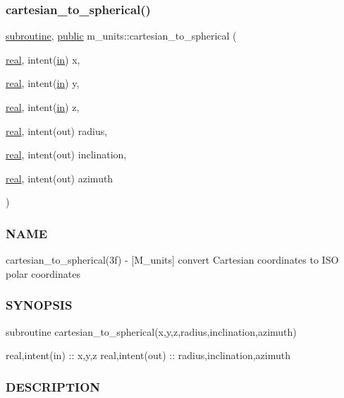 \subsubsection{\texorpdfstring{cartesian\+\_\+to\+\_\+spherical()}{cartesian\_to\_spherical()}}
{\footnotesize\ttfamily \hyperlink{M__stopwatch_83_8txt_acfbcff50169d691ff02d4a123ed70482}{subroutine}, \hyperlink{M__stopwatch_83_8txt_a2f74811300c361e53b430611a7d1769f}{public} m\+\_\+units\+::cartesian\+\_\+to\+\_\+spherical (\begin{DoxyParamCaption}\item[{\hyperlink{read__watch_83_8txt_abdb62bde002f38ef75f810d3a905a823}{real}, intent(\hyperlink{M__journal_83_8txt_afce72651d1eed785a2132bee863b2f38}{in})}]{x,  }\item[{\hyperlink{read__watch_83_8txt_abdb62bde002f38ef75f810d3a905a823}{real}, intent(\hyperlink{M__journal_83_8txt_afce72651d1eed785a2132bee863b2f38}{in})}]{y,  }\item[{\hyperlink{read__watch_83_8txt_abdb62bde002f38ef75f810d3a905a823}{real}, intent(\hyperlink{M__journal_83_8txt_afce72651d1eed785a2132bee863b2f38}{in})}]{z,  }\item[{\hyperlink{read__watch_83_8txt_abdb62bde002f38ef75f810d3a905a823}{real}, intent(out)}]{radius,  }\item[{\hyperlink{read__watch_83_8txt_abdb62bde002f38ef75f810d3a905a823}{real}, intent(out)}]{inclination,  }\item[{\hyperlink{read__watch_83_8txt_abdb62bde002f38ef75f810d3a905a823}{real}, intent(out)}]{azimuth }\end{DoxyParamCaption})}



\subsubsection*{N\+A\+ME}

cartesian\+\_\+to\+\_\+spherical(3f) -\/ \mbox{[}M\+\_\+units\mbox{]} convert Cartesian coordinates to I\+SO polar coordinates \subsubsection*{S\+Y\+N\+O\+P\+S\+IS}

subroutine cartesian\+\_\+to\+\_\+spherical(x,y,z,radius,inclination,azimuth)

real,intent(in) \+:\+: x,y,z real,intent(out) \+:\+: radius,inclination,azimuth

\subsubsection*{D\+E\+S\+C\+R\+I\+P\+T\+I\+ON}

